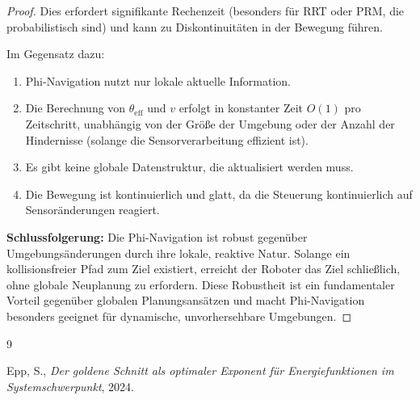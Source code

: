 ﻿\documentclass[a4paper,12pt]{article}
\theoremstyle{definition}
\begin{document}
\begin{proof}
Dies erfordert signifikante Rechenzeit (besonders für RRT oder PRM, die probabilistisch sind) und kann zu Diskontinuitäten in der Bewegung führen.

Im Gegensatz dazu:
\begin{enumerate}
\item Phi-Navigation nutzt nur lokale aktuelle Information.
\item Die Berechnung von $\theta_{\text{eff}}$ und $v$ erfolgt in konstanter Zeit $O(1)$ pro Zeitschritt, unabhängig von der Größe der Umgebung oder der Anzahl der Hindernisse (solange die Sensorverarbeitung effizient ist).
\item Es gibt keine globale Datenstruktur, die aktualisiert werden muss.
\item Die Bewegung ist kontinuierlich und glatt, da die Steuerung kontinuierlich auf Sensoränderungen reagiert.
\end{enumerate}

\textbf{Schlussfolgerung:} Die Phi-Navigation ist robust gegenüber Umgebungsänderungen durch ihre lokale, reaktive Natur. Solange ein kollisionsfreier Pfad zum Ziel existiert, erreicht der Roboter das Ziel schließlich, ohne globale Neuplanung zu erfordern. Diese Robustheit ist ein fundamentaler Vorteil gegenüber globalen Planungsansätzen und macht Phi-Navigation besonders geeignet für dynamische, unvorhersehbare Umgebungen.
\end{proof}


\begin{thebibliography}{9}

Epp, S.,
\textit{Der goldene Schnitt als optimaler Exponent für Energiefunktionen im Systemschwerpunkt},
2024.

\end{thebibliography}
\end{document}
